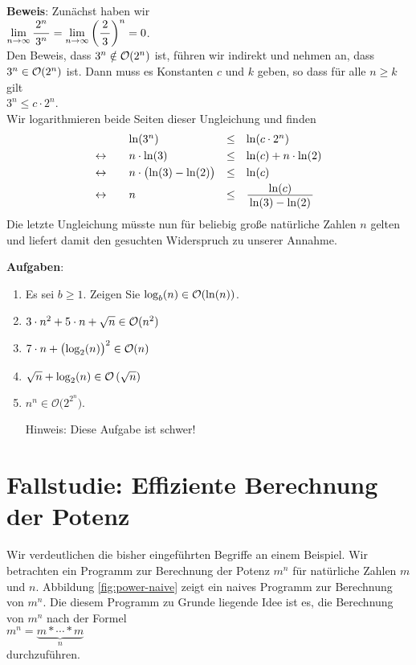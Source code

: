 \noindent
\textbf{Beweis}:  Zun\"achst haben wir \\[0.1cm]
\hspace*{1.3cm} 
$\displaystyle\lim\limits_{n \rightarrow \infty} \bruch{2^n}{3^n} = 
 \lim\limits_{n \rightarrow \infty} \left(\bruch{2}{3}\right)^n = 0$.
\\[0.1cm]
Den Beweis, dass $3^n \notin \mathcal{O}(2^n)$ ist, f\"uhren wir indirekt und nehmen an, dass 
$3^n \in \mathcal{O}(2^n)$ ist.  Dann muss es Konstanten $c$ und $k$ geben, so dass f\"ur alle $n
\geq k$ gilt \\[0.1cm]
\hspace*{1.3cm} $3^n \leq c \cdot 2^n$. \\[0.1cm]
Wir logarithmieren beide Seiten dieser Ungleichung und finden \\[0.1cm]
\[
\begin{array}{llcl}
                & \ln(3^n) & \leq & \ln(c \cdot 2^n) \\[0.1cm]
\leftrightarrow\quad &  n \cdot \ln(3) & \leq & \ln(c) + n \cdot \ln(2) \\[0.1cm]
\leftrightarrow &  n \cdot \bigl(\ln(3) - \ln(2)\bigr) & \leq & \ln(c)  \\[0.1cm]
\leftrightarrow &  n  & \leq & \bruch{\ln(c)}{\ln(3) - \ln(2)}  \\[0.1cm]
\end{array}
\]
Die letzte Ungleichung m\"usste nun f\"ur beliebig gro{\ss}e nat\"urliche Zahlen $n$ gelten und liefert
damit den gesuchten Widerspruch zu unserer Annahme.
\vspace*{0.3cm}

\noindent
\textbf{Aufgaben}:  
\begin{enumerate}
\item Es sei $b \geq 1$. Zeigen Sie $\log_{b}(n) \in \mathcal{O}(\ln(n))$.
\item $3 \cdot n^2 + 5 \cdot n + \sqrt{n} \in \mathcal{O}(n^2)$
\item $7 \cdot n + \bigl(\log_2(n)\bigr)^2 \in \mathcal{O}(n)$
\item $\sqrt{n} + \log_2(n) \in \mathcal{O}\left(\sqrt{n}\right)$
\item $n^n \in \mathcal{O}\bigl(2^{2^n}\bigr)$.

      Hinweis:  Diese Aufgabe ist schwer!
\end{enumerate}


\section{Fallstudie: Effiziente Berechnung der Potenz}
Wir  verdeutlichen die bisher eingef\"uhrten Begriffe an einem Beispiel.  Wir betrachten ein
Programm zur Berechnung der Potenz $m^n$ f\"ur nat\"urliche Zahlen $m$ und $n$.
Abbildung \ref{fig:power-naive} zeigt ein naives Programm zur Berechnung von $m^n$.
Die diesem Programm zu Grunde liegende Idee ist es, die Berechnung von $m^n$ 
nach der Formel \\[0.1cm]
\hspace*{1.3cm} 
$m^n = \underbrace{m * \cdots * m}_n$ \\[0.1cm]
durchzuf\"uhren.  

